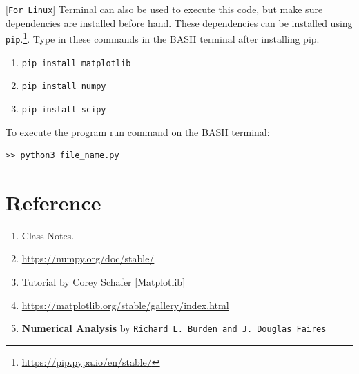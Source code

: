 \documentclass[11pt,a4paper]{article}
\begin{document}
[\texttt{For Linux}] Terminal can also be used to execute this code, but make sure dependencies are installed before hand. These dependencies can be installed using  \texttt{pip}.\footnote{\url{https://pip.pypa.io/en/stable/}}. Type in these commands in the BASH terminal after installing pip.

\begin{enumerate}
\item \texttt{pip install matplotlib}
\item \texttt{pip install numpy}
\item \texttt{pip install scipy}
\end{enumerate}

To execute the program run command on the BASH terminal:
\begin{verbatim}
>> python3 file_name.py
\end{verbatim}

\section*{Reference}

\begin{enumerate}
\item Class Notes.
\item \url{https://numpy.org/doc/stable/}
\item Tutorial by Corey Schafer [Matplotlib]
\item \url{https://matplotlib.org/stable/gallery/index.html}
\item \textbf{Numerical Analysis} by \texttt{Richard L. Burden and J. Douglas Faires} 
\end{enumerate}
\end{document}
